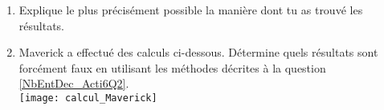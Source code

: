 \begin{activite}
\begin{enumerate}
 \item Explique le plus précisément possible la manière dont tu as trouvé les résultats.\label{NbEntDec_Acti6Q2}
 \item Maverick a effectué des calculs ci-dessous. Détermine quels résultats sont forcément faux en utilisant les méthodes décrites à la question \ref{NbEntDec_Acti6Q2}.\\[1em]
\texttt{[image: calcul\_Maverick]}

 \end{enumerate}
 
 \end{activite}




